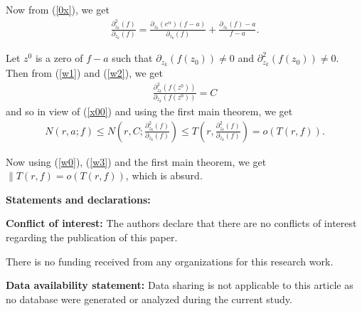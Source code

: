 \documentclass[11pt, reqno]{amsart}
\numberwithin{equation}{section}
\begin{document}
Now from (\ref{0x}), we get
\begin{align}\label{w2} 
\frac{\partial_{z_k}^2(f)}{\partial_{z_k}(f)}=\frac{\partial_{z_k}(e^{\alpha})(f-a)}{\partial_{z_k}(f)}+\frac{\partial_{z_k}(f)-a}{f-a}.
\end{align}

Let $z^0$ is a zero of $f-a$ such that $\partial_{z_k}(f(z_0))\neq 0$ and $\partial^2_{z_k}(f(z_0))\neq 0$. Then from (\ref{w1}) and (\ref{w2}), we get
\begin{align*}
\frac{\partial_{z_k}^2(f(z^0))}{\partial_{z_k}(f(z^0))}=C
\end{align*}
and so in view of (\ref{x00}) and using the first main theorem, we get
\begin{align}\label{w3}
N(r,a;f)\leq N\left(r,C;\frac{\partial_{z_k}^2(f)}{\partial_{z_k}(f)}\right)\leq T\left(r,\frac{\partial_{z_k}^2(f)}{\partial_{z_k}(f)}\right)=o(T(r,f)).
\end{align}

Now using (\ref{w0}), (\ref{w3}) and the first main theorem, we get $\parallel T(r,f)=o(T(r,f))$, which is absurd.


\medskip
{\bf Statements and declarations:}


\smallskip
\noindent \textbf {Conflict of interest:} The authors declare that there are no conflicts of interest regarding the publication of this paper.

\smallskip
{} There is no funding received from any organizations for this research work.

\smallskip
\noindent \textbf {Data availability statement:}  Data sharing is not applicable to this article as no database were generated or analyzed during the current study.
\end{document}

